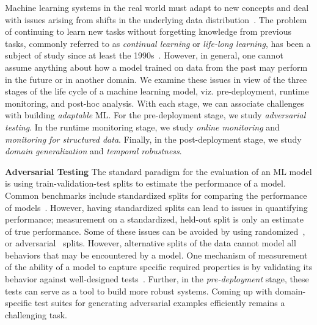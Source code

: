 Machine learning systems in the real world must adapt to new concepts and deal with issues arising from shifts in the underlying data distribution~\citep{huyen2022designing}.
The problem of continuing to learn new tasks without forgetting knowledge from previous tasks, commonly referred to as \textit{continual learning} or \textit{life-long learning}, has been a subject of study since at least the 1990s~\citep{thrun1998lifelong}.
However, in general, one cannot assume anything about how a model trained on data from the past may perform in the future or in another domain. 
We examine these issues in view of the three stages of the life cycle of a machine learning model, viz. pre-deployment, runtime monitoring, and post-hoc analysis.
With each stage, we can associate challenges with building \textit{adaptable} ML.
For the pre-deployment stage, we study \textit{adversarial testing}.
In the runtime monitoring stage, we study \textit{online monitoring} and \textit{monitoring for structured data}.
Finally, in the post-deployment stage, we study \textit{domain generalization} and \textit{temporal robustness}. 

\noindent \textbf{Adversarial Testing}
The standard paradigm for the evaluation of an ML model is using train-validation-test splits to estimate the performance of a model. 
Common benchmarks include standardized splits for comparing the performance of models~\citep{gorman2019need}.
However, having standardized splits can lead to issues in quantifying performance; measurement on a standardized, held-out split is only an estimate of true performance.
Some of these issues can be avoided by using randomized~\citep{gorman2019need}, or adversarial~\citep{sogaard2021need} splits.
However, alternative splits of the data cannot model all behaviors that may be encountered by a model.
One mechanism of measurement of the ability of a model to capture specific required properties is by validating its behavior against well-designed tests~\cite{ribeiro2020beyond}.
Further, in the \textit{pre-deployment} stage, these tests can serve as a tool to build more robust systems. 
Coming up with domain-specific test suites for generating adversarial examples efficiently remains a challenging task.

